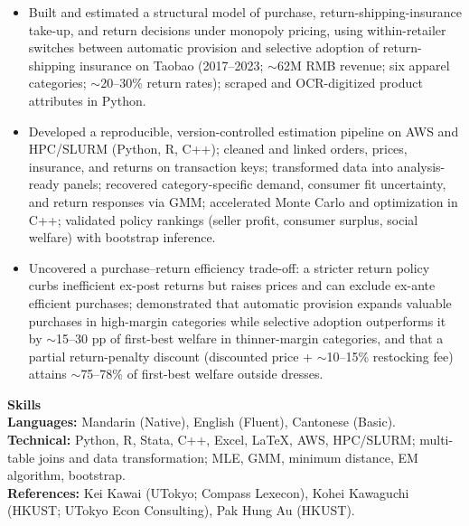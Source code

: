 \documentclass[11pt,letterpaper]{article}
\begin{document}
\begin{itemize}
  \item Built and estimated a structural model of purchase, return-shipping-insurance take-up, and return decisions under monopoly pricing, using within-retailer switches between automatic provision and selective adoption of return-shipping insurance on Taobao (2017--2023; \(\sim\)62M RMB revenue; six apparel categories; \(\sim\)20--30\% return rates); scraped and OCR-digitized product attributes in Python.
  \item Developed a reproducible, version-controlled estimation pipeline on AWS and HPC/SLURM (Python, R, C++); cleaned and linked orders, prices, insurance, and returns on transaction keys; transformed data into analysis-ready panels; recovered category-specific demand, consumer fit uncertainty, and return responses via GMM; accelerated Monte Carlo and optimization in C++; validated policy rankings (seller profit, consumer surplus, social welfare) with bootstrap inference.
  \item Uncovered a purchase--return efficiency trade-off: a stricter return policy curbs inefficient ex-post returns but raises prices and can exclude ex-ante efficient purchases; demonstrated that automatic provision expands valuable purchases in high-margin categories while selective adoption outperforms it by \(\sim\)15--30 pp of first-best welfare in thinner-margin categories, and that a partial return-penalty discount (discounted price + \(\sim\)10--15\% restocking fee) attains \(\sim\)75--78\% of first-best welfare outside dresses.
\end{itemize}

\vspace{0.15pt}

{\large \textbf{Skills}}\\[-0.5pt]
\textbf{Languages:} Mandarin (Native), English (Fluent), Cantonese (Basic).\\
\textbf{Technical:} Python, R, Stata, C++, Excel, \LaTeX, AWS, HPC/SLURM; multi-table joins and data transformation; MLE, GMM, minimum distance, EM algorithm, bootstrap.\\
\textbf{References:} Kei Kawai (UTokyo; Compass Lexecon), Kohei Kawaguchi (HKUST; UTokyo Econ Consulting), Pak Hung Au (HKUST).
\end{document}
